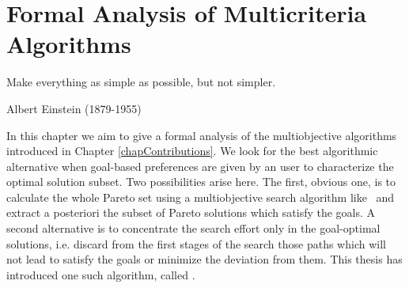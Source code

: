 %
%
%
%
%
%

\chapter{Formal Analysis of Multicriteria Algorithms}
\label{chapFormalAnalysis}

\begin{FraseCelebre}
\begin{Frase}
Make everything as simple as possible, but not simpler.
\end{Frase}
\begin{Fuente}
Albert Einstein (1879-1955)
\end{Fuente}
\end{FraseCelebre}
%
%

In this chapter we aim to give a formal analysis of the multiobjective algorithms introduced in Chapter \ref{chapContributions}. We look for the best algorithmic alternative when goal-based preferences are given by an user to characterize the optimal solution subset. Two possibilities arise here. The first, obvious one, is to calculate the whole Pareto set using a multiobjective search algorithm like \namoa \ and extract a posteriori the subset of Pareto solutions which satisfy the goals. A second alternative is to concentrate the search effort only in the goal-optimal solutions, i.e. discard from the first stages of the search those paths which will not lead to satisfy the goals or minimize the deviation from them. This thesis has introduced one such algorithm, called \lexgo. 

